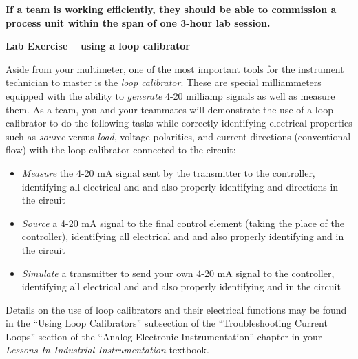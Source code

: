 \vskip 10pt

{\bf If a team is working efficiently, they should be able to commission a process unit within the span of one 3-hour lab session.}








\vfil \eject

\noindent
{\bf Lab Exercise -- using a loop calibrator}

\vskip 5pt

Aside from your multimeter, one of the most important tools for the instrument technician to master is the {\it loop calibrator}.  These are special milliammeters equipped with the ability to {\it generate} 4-20 milliamp signals as well as measure them.  As a team, you and your teammates will demonstrate the use of a loop calibrator to do the following tasks while correctly identifying electrical properties such as {\it source} versus {\it load}, voltage polarities, and current directions (conventional flow) with the loop calibrator connected to the circuit:

\vskip 10pt

\begin{itemize}
\item{} {\it Measure} the 4-20 mA signal sent by the transmitter to the controller, identifying all electrical  and  and also properly identifying  and  directions in the circuit
\vskip 15pt 
\item{} {\it Source} a 4-20 mA signal to the final control element (taking the place of the controller), identifying all electrical  and  and also properly identifying  and  in the circuit
\vskip 15pt 
\item{} {\it Simulate} a transmitter to send your own 4-20 mA signal to the controller, identifying all electrical  and  and also properly identifying  and  in the circuit
\end{itemize}

\vskip 10pt

Details on the use of loop calibrators and their electrical functions may be found in the ``Using Loop Calibrators'' subsection of the ``Troubleshooting Current Loops'' section of the ``Analog Electronic Instrumentation'' chapter in your {\it Lessons In Industrial Instrumentation} textbook.

